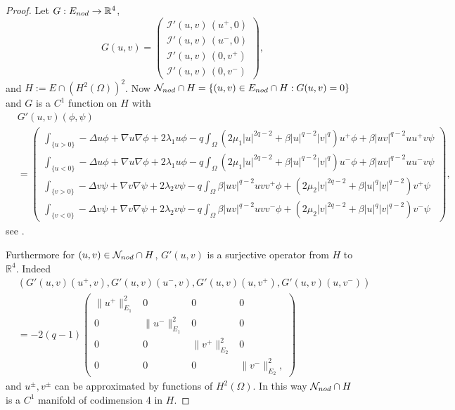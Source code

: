 \documentclass[10pt,a4paper]{amsart}
\numberwithin{equation}{section}
\begin{document}
\begin{proof}
Let $G:E_{\rm nod}\to\mathbb{R}^4$,
\[
G(u,v)=\begin{pmatrix}
\mathcal I'(u,v) \, (u^+,0) \\ \mathcal I'(u,v) \, (u^-,0) \\
\mathcal I'(u,v) \, (0,v^+) \\ \mathcal I'(u,v) \, (0,v^-)
 \end{pmatrix},
\]
and $H:=E\cap \left(H^2(\Omega)\right)^2$.
Now $\mathcal N_{\rm nod}\cap H = \{(u,v)\in E_{\rm nod}\cap H : G(u,v)=0\}$ and $G$
is a $C^1$ function on $H$ with
\begin{align*}
&G'(u,v)(\phi,\psi) \\
&=\begin{pmatrix}
\int_{\{u>0\}} -\Delta u \phi + \nabla u \nabla \phi
 + 2\lambda_1 u \phi - q \int_{\Omega}
 \left(2\mu_1|u|^{2q-2}+\beta|u|^{q-2}|v|^q\right)u^+ \phi
 + \beta |uv|^{q-2} uu^+v\psi
\\
\int_{\{u<0\}} -\Delta u \phi + \nabla u \nabla \phi + 2\lambda_1 u \phi
 - q \int_{\Omega} \left(2\mu_1|u|^{2q-2}+\beta|u|^{q-2}|v|^q\right)u^- \phi
 + \beta |uv|^{q-2} uu^-v\psi
\\
\int_{\{v>0\}} -\Delta v \psi + \nabla v \nabla \psi + 2\lambda_2 v \psi
 - q \int_{\Omega} \beta |uv|^{q-2} uvv^+
  \phi+\left(2\mu_2|v|^{2q-2}+\beta|u|^{q}|v|^{q-2}\right)v^+ \psi
\\
\int_{\{v<0\}} -\Delta v \psi + \nabla v \nabla \psi
 + 2\lambda_2 v \psi - q \int_{\Omega} \beta |uv|^{q-2} uvv^-
 \phi+\left(2\mu_2|v|^{2q-2}+\beta|u|^{q}|v|^{q-2}\right)v^- \psi
\end{pmatrix},
\end{align*}
see \cite[Lemma 3.1]{BW_JDE06}.

Furthermore for $(u,v)\in \mathcal N_{\rm nod}\cap H$, $G'(u,v)$ is a surjective
operator from $H$ to $\mathbb{R}^4$. Indeed
\begin{align*}
&\left( G'(u,v)(u^+,v), G'(u,v)(u^-,v), G'(u,v)(u,v^+), G'(u,v)(u,v^-) \right) \\
& = -2(q-1)\begin{pmatrix} \|u^+\|_{E_1}^2 & 0 & 0 & 0 \\
 0 & \|u^-\|_{E_1}^2 & 0 & 0 \\
 0 & 0 & \|v^+\|_{E_2}^2 & 0 \\
 0 & 0& 0& \|v^-\|_{E_2}^2 ,
\end{pmatrix}
\end{align*}
and $u^{\pm}, v^{\pm}$ can be approximated by functions of $H^2(\Omega)$.
In this way $\mathcal N_{\rm nod}\cap H$ is a $C^1$ manifold of codimension 4 in
$H$.


\end{proof}
\end{document}
